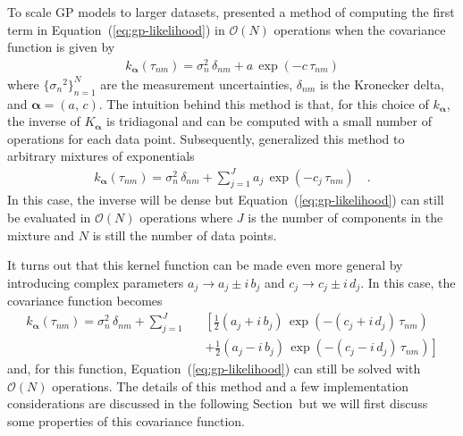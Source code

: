 \documentclass[manuscript, letterpaper]{aastex6}
\renewcommand{\eqref}[1]{\ref{eq:#1}}
\newcommand{\Eq}[1]{Equation~(\eqref{#1})}
\newcommand{\eq}[1]{\Eq{#1}}
\newcommand{\eqlabel}[1]{\label{eq:#1}}
\newcommand{\sectionname}{Section}
\newcommand{\bvec}[1]{{\ensuremath{\boldsymbol{#1}}}}
\begin{document}
To scale GP models to larger datasets, \citet{Rybicki:1995} presented a method
of computing the first term in \eq{gp-likelihood} in $\mathcal{O}(N)$
operations when the covariance function is given by
\begin{eqnarray}\eqlabel{kernel-simple}
k_\bvec{\alpha}(\tau_{nm}) = \sigma_n^2\,\delta_{nm} + a\,\exp(-c\,\tau_{nm})
\end{eqnarray}
where $\{{\sigma_n}^2\}_{n=1}^N$ are the measurement uncertainties,
$\delta_{nm}$ is the Kronecker delta, and $\bvec{\alpha} = (a,\,c)$.
The intuition behind this method is that, for this choice of $k_\bvec{\alpha}$,
the inverse of $K_\bvec{\alpha}$ is tridiagonal and can be computed
with a small number of operations for each data point.
Subsequently, \citet{Ambikasaran:2015} generalized this method to arbitrary
mixtures of exponentials
\begin{eqnarray}
k_\bvec{\alpha}(\tau_{nm}) = \sigma_n^2\,\delta_{nm} +
    \sum_{j=1}^J a_j\,\exp(-c_j\,\tau_{nm})\quad.
\end{eqnarray}
In this case, the inverse will be dense but \eq{gp-likelihood} can still be
evaluated in $\mathcal{O}(N)$ operations where $J$ is the number of components
in the mixture and $N$ is still the number of data points.

It turns out that this kernel function can be made even more general by
introducing complex parameters $a_j \to a_j\pm i\,b_j$ and
$c_j \to c_j\pm i\,d_j$.
In this case, the covariance function becomes
\begin{eqnarray}\eqlabel{celerite-kernel-complex}
k_\bvec{\alpha}(\tau_{nm}) = \sigma_n^2\,\delta_{nm} +
    \sum_{j=1}^J &&\left[
    \frac{1}{2}(a_j + i\,b_j)\,\exp\left(-(c_j+i\,d_j)\,\tau_{nm}\right)
        \right. \nonumber\\
    &&+\left.
    \frac{1}{2}(a_j - i\,b_j)\,\exp\left(-(c_j-i\,d_j)\,\tau_{nm}\right)
\right]
\end{eqnarray}
and, for this function, \eq{gp-likelihood} can still be solved with
$\mathcal{O}(N)$ operations.
The details of this method and a few implementation considerations are
discussed in the following \sectionname\ but we will first discuss some
properties of this covariance function.
\end{document}

